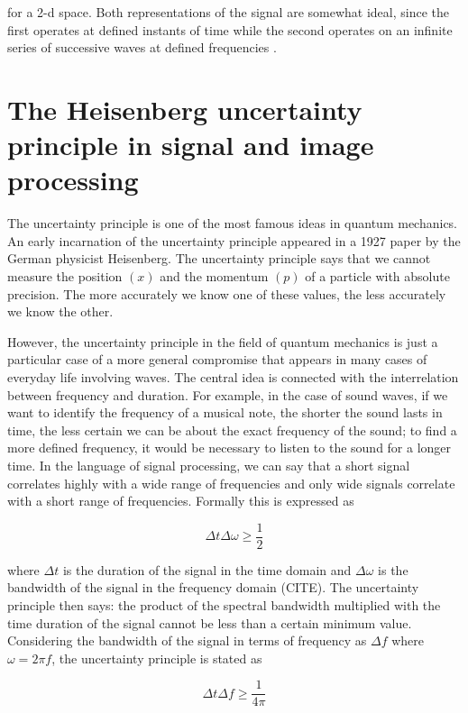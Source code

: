 for a 2-d space. Both representations of the signal are somewhat ideal, since the first operates at defined instants of time while the second operates on an infinite series of successive waves at defined frequencies \cite{Gabor:JIEE:1946a}. 

\section{The Heisenberg uncertainty principle in signal and image
processing}

The uncertainty principle is one of the most famous ideas in quantum mechanics. An early incarnation of the uncertainty principle appeared in a 1927 paper by the German physicist Heisenberg. The uncertainty principle says that we cannot measure the position $(x)$ and the momentum $(p)$ of a particle with absolute precision. The more accurately we know one of these values, the less accurately we know the other. 

However, the uncertainty principle in the field of quantum mechanics is just a particular case of a more general compromise that appears in many cases of everyday life involving waves. The central idea is connected with the interrelation between frequency and duration. For example, in the case of sound waves, if we want to identify the frequency of a musical note, the shorter the sound lasts in time, the less certain we can be about the exact frequency of the sound; to find a more defined frequency, it would be necessary to listen to the sound for a longer time. In the language of signal processing, we can say that a short signal correlates highly with a wide range of frequencies and only wide signals correlate with a short range of frequencies. Formally this is expressed as

\begin{equation}\label{eq:uncertainty_principle_rad}
	\Delta t\Delta \omega \geq \frac{1}{2}
\end{equation}

where $\Delta t$ is the duration of the signal in the time domain and $\Delta \omega$ is the bandwidth of the signal in the frequency domain (CITE). The uncertainty principle then says: the product of the spectral bandwidth multiplied with the time duration of the signal cannot be less than a certain minimum value. Considering the bandwidth of the signal in terms of frequency as $\Delta f$ where $\omega = 2\pi f$, the uncertainty principle is stated as 

\begin{equation}\label{eq:uncertainty_principle_freq}
	\Delta t\Delta f \geq \frac{1}{4\pi}
\end{equation}


